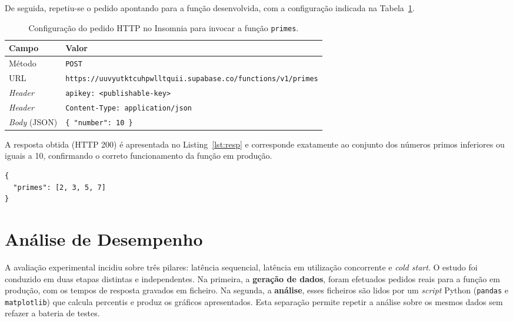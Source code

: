 \documentclass[conference]{IEEEtran}
\begin{document}
De seguida, repetiu-se o pedido apontando para a função desenvolvida, com a configuração indicada na Tabela~\ref{tab:insomnia}.

\begin{table}[!htbp]
\caption{Configuração do pedido HTTP no Insomnia para invocar a função \texttt{primes}.}
\label{tab:insomnia}
\centering
\renewcommand{\arraystretch}{1.2}
\footnotesize
\begin{tabular}{@{}p{1.8cm}p{5.6cm}@{}}
\toprule
\textbf{Campo} & \textbf{Valor} \\
\midrule
Método & \texttt{POST} \\
URL & \texttt{https://uuvyutktcuhpwlltquii.supabase.\allowbreak co/functions/v1/primes} \\
\textit{Header} & \texttt{apikey: <publishable-key>} \\
\textit{Header} & \texttt{Content-Type: application/json} \\
\textit{Body} (JSON) & \texttt{\{ "number": 10 \}} \\
\bottomrule
\end{tabular}
\end{table}

A resposta obtida (HTTP 200) é apresentada no Listing~\ref{lst:resp} e corresponde exatamente ao conjunto dos números primos inferiores ou iguais a 10, confirmando o correto funcionamento da função em produção.

\begin{lstlisting}[language={}, caption={Resposta da função \texttt{primes} para \texttt{number = 10}.}, label={lst:resp}]
{
  "primes": [2, 3, 5, 7]
}
\end{lstlisting}

\section{Análise de Desempenho}
A avaliação experimental incidiu sobre três pilares: latência sequencial, latência em utilização concorrente e \textit{cold start}. O estudo foi conduzido em duas etapas distintas e independentes. Na primeira, a \textbf{geração de dados}, foram efetuados pedidos reais para a função em produção, com os tempos de resposta gravados em ficheiro. Na segunda, a \textbf{análise}, esses ficheiros são lidos por um \textit{script} Python (\texttt{pandas} e \texttt{matplotlib}) que calcula percentis e produz os gráficos apresentados. Esta separação permite repetir a análise sobre os mesmos dados sem refazer a bateria de testes.
\end{document}
